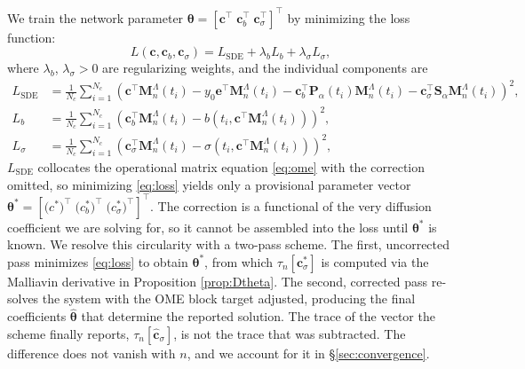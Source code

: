 \documentclass[11pt, a4paper]{article}
\theoremstyle{theoremstyle}
\theoremstyle{definitionstyle}
\begin{document}
We train the network parameter $\boldsymbol \theta = [\mathbf c^\top \; \mathbf c_b^\top \; \mathbf c_\sigma^\top]^\top$ by minimizing the loss function:
\begin{equation}\label{eq:loss}
    L(\mathbf c, \mathbf c_b, \mathbf c_\sigma) = L_{\mathrm{SDE}} + \lambda_bL_b + \lambda_\sigma L_\sigma, 
\end{equation}
where $\lambda_b$, $\lambda_\sigma > 0$ are regularizing weights, and the individual components are
\label{sec:collocation_loss}
\begin{subequations}\label{eq:loss_components}
    \begin{align}
        L_{\mathrm{SDE}} &= \frac 1{N_c}\sum_{i=1}^{N_c} \left ( \mathbf c^\top \mathbf M_n^\Lambda(t_i) - y_0\mathbf e^\top \mathbf M_n^\Lambda(t_i) - \mathbf c_b^\top \mathbf P_\alpha(t_i) \mathbf M_n^\Lambda(t_i) - \mathbf c_\sigma^\top \mathbf S_\alpha \mathbf M_n^\Lambda(t_i) \right )^2, \\
        L_b &= \frac 1{N_c} \sum_{i=1}^{N_c} \left ( \mathbf c_b^\top \mathbf M_n^\Lambda(t_i) - b(t_i, \mathbf c^\top \mathbf M_n^\Lambda(t_i))\right )^2, \\
        L_\sigma &= \frac 1{N_c} \sum_{i=1}^{N_c} \left ( \mathbf c_\sigma^\top \mathbf M_n^\Lambda(t_i) - \sigma(t_i, \mathbf c^\top \mathbf M_n^\Lambda(t_i))\right )^2,
    \end{align}
\end{subequations}
$L_{\mathrm{SDE}}$ collocates the operational matrix equation \eqref{eq:ome} with the correction omitted, so minimizing \eqref{eq:loss} yields only a provisional parameter vector $\boldsymbol \theta^* = [\mathbf (c^*)^\top \; \mathbf (c_b^*)^\top \; \mathbf (c_\sigma^*)^\top]^\top$. The correction is a functional of the very diffusion coefficient we are solving for, so it cannot be assembled into the loss until $\boldsymbol \theta^*$ is known. We resolve this circularity with a two-pass scheme. The first, uncorrected pass minimizes \eqref{eq:loss} to obtain $\boldsymbol \theta^*$, from which $\tau_n[\mathbf c_\sigma^*]$ is computed via the Malliavin derivative in Proposition \ref{prop:Dtheta}. The second, corrected pass re-solves the system with the OME block target adjusted, producing the final coefficients $\hat{\boldsymbol \theta}$ that determine the reported solution. The trace of the vector the scheme finally reports, $\tau_n[\hat{\mathbf c}_\sigma]$, is not the trace that was subtracted. The difference does not vanish with $n$, and we account for it in \S\ref{sec:convergence}.
\end{document}
